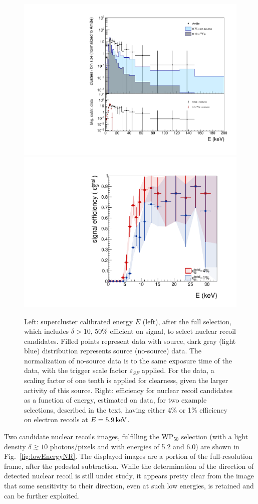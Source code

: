 \begin{figure}[ht]
  \begin{center}
    \includegraphics[width=0.45\linewidth]{figures/energyFull_WP50}
    \includegraphics[width=0.45\linewidth]{figures/energyFull_effi}

    \caption{Left: supercluster calibrated energy $E$ (left), after the
      full selection, which includes $\delta>10$, 50\% efficient on
      signal, to select nuclear recoil candidates. Filled points
      represent data with \ambe source, dark gray (light blue)
      distribution represents   \fe source (no-source) data.  The
      normalization of no-source  data  is to the same exposure
      time of the \ambe data, with the trigger scale factor
      $\varepsilon_{SF}$ applied. For the  \fe data, a scaling
      factor of one tenth is applied for clearness, given the larger
      activity of this source. Right: efficiency for nuclear recoil
      candidates as a function of energy, estimated on \ambe data, for
      two example selections, described in the text, having either 4\%
      or 1\% efficiency on electron recoils at
      $E=5.9\,\textrm{ke\hspace{-.08em}V}$. \label{fig:fullsel_effi}}

  \end{center}
\end{figure}

Two candidate nuclear recoils images, fulfilling the
$\mathrm{WP}_{50}$ selection (with a light density $\delta\gtrsim10$
photons/pixels and with energies of 5.2 and 6.0\keV) are shown in
Fig.~\ref{fig:lowEnergyNR}. The displayed images are a portion of the
full-resolution frame, after the pedestal subtraction. While the
determination of the direction of detected nuclear recoil is still
under study, it appears pretty clear from the image that some
sensitivity to their direction, even at such low energies, is retained
and can be further exploited.

